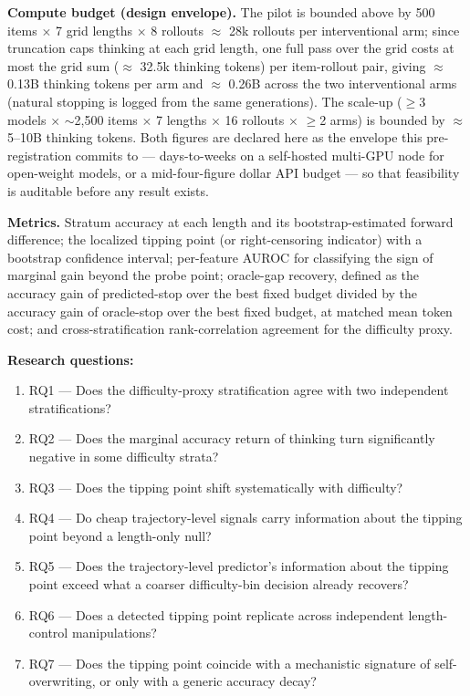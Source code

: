 \documentclass[11pt]{article}
\begin{document}
\textbf{Compute budget (design envelope).} The pilot is bounded above by 500 items $\times$ 7 grid lengths $\times$ 8 rollouts $\approx$ 28k rollouts per interventional arm; since truncation caps thinking at each grid length, one full pass over the grid costs at most the grid sum ($\approx$ 32.5k thinking tokens) per item-rollout pair, giving $\approx$ 0.13B thinking tokens per arm and $\approx$ 0.26B across the two interventional arms (natural stopping is logged from the same generations). The scale-up ($\geq$3 models $\times$ $\sim$2{,}500 items $\times$ 7 lengths $\times$ 16 rollouts $\times$ $\geq$2 arms) is bounded by $\approx$ 5--10B thinking tokens. Both figures are declared here as the envelope this pre-registration commits to --- days-to-weeks on a self-hosted multi-GPU node for open-weight models, or a mid-four-figure dollar API budget --- so that feasibility is auditable before any result exists.

\textbf{Metrics.} Stratum accuracy at each length and its bootstrap-estimated forward difference; the localized tipping point (or right-censoring indicator) with a bootstrap confidence interval; per-feature AUROC for classifying the sign of marginal gain beyond the probe point; oracle-gap recovery, defined as the accuracy gain of predicted-stop over the best fixed budget divided by the accuracy gain of oracle-stop over the best fixed budget, at matched mean token cost; and cross-stratification rank-correlation agreement for the difficulty proxy.

\textbf{Research questions:}
\begin{enumerate}[leftmargin=1.6em]
\item RQ1 --- Does the difficulty-proxy stratification agree with two independent stratifications?
\item RQ2 --- Does the marginal accuracy return of thinking turn significantly negative in some difficulty strata?
\item RQ3 --- Does the tipping point shift systematically with difficulty?
\item RQ4 --- Do cheap trajectory-level signals carry information about the tipping point beyond a length-only null?
\item RQ5 --- Does the trajectory-level predictor's information about the tipping point exceed what a coarser difficulty-bin decision already recovers?
\item RQ6 --- Does a detected tipping point replicate across independent length-control manipulations?
\item RQ7 --- Does the tipping point coincide with a mechanistic signature of self-overwriting, or only with a generic accuracy decay?
\end{enumerate}
\end{document}
